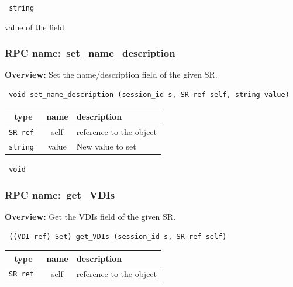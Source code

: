 {\tt 
string
}


value of the field
\vspace{0.3cm}
\vspace{0.3cm}
\vspace{0.3cm}
\subsubsection{RPC name:~set\_name\_description}

{\bf Overview:} 
Set the name/description field of the given SR.

\begin{verbatim} void set_name_description (session_id s, SR ref self, string value)\end{verbatim}



 
\vspace{0.3cm}
\begin{tabular}{|c|c|p{7cm}|}
 \hline
{\bf type} & {\bf name} & {\bf description} \\ \hline
{\tt SR ref } & self & reference to the object \\ \hline 

{\tt string } & value & New value to set \\ \hline 

\end{tabular}

\vspace{0.3cm}

{\tt 
void
}



\vspace{0.3cm}
\vspace{0.3cm}
\vspace{0.3cm}
\subsubsection{RPC name:~get\_VDIs}

{\bf Overview:} 
Get the VDIs field of the given SR.

\begin{verbatim} ((VDI ref) Set) get_VDIs (session_id s, SR ref self)\end{verbatim}



 
\vspace{0.3cm}
\begin{tabular}{|c|c|p{7cm}|}
 \hline
{\bf type} & {\bf name} & {\bf description} \\ \hline
{\tt SR ref } & self & reference to the object \\ \hline 

\end{tabular}

